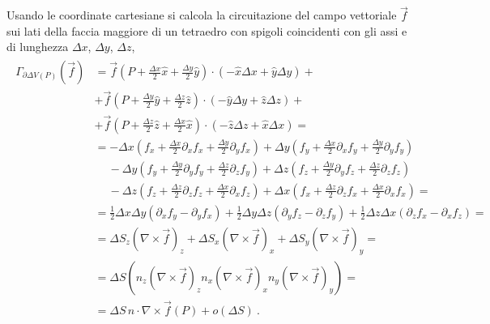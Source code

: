 \documentclass[letterpaper,10pt,english]{jupyterBook}
\begin{document}
\sphinxAtStartPar
Usando le coordinate cartesiane si calcola la circuitazione del campo vettoriale \(\vec{f}\) sui lati della faccia maggiore di un tetraedro con spigoli coincidenti con gli assi e di lunghezza \(\Delta x\), \(\Delta y\), \(\Delta z\),
\begin{equation*}
\begin{split}\begin{aligned}
  \Gamma_{\partial \Delta V(P)}\left(\vec{f}\right) 
  & = \vec{f}\left( P + \frac{\Delta x}{2} \hat{x} + \frac{\Delta y}{2} \hat{y} \right) \cdot \left( - \hat{x} \Delta x + \hat{y} \Delta y \right) + \\
  & + \vec{f}\left( P + \frac{\Delta y}{2} \hat{y} + \frac{\Delta z}{2} \hat{z} \right) \cdot \left( - \hat{y} \Delta y + \hat{z} \Delta z \right) + \\
  & + \vec{f}\left( P + \frac{\Delta z}{2} \hat{z} + \frac{\Delta x}{2} \hat{x} \right) \cdot \left( - \hat{z} \Delta z + \hat{x} \Delta x \right) = \\
  & =       - \Delta x \left( f_x + \frac{\Delta x}{2} \partial_x f_x + \frac{\Delta y}{2} \partial_y f_x \right)
            + \Delta y \left( f_y + \frac{\Delta x}{2} \partial_x f_y + \frac{\Delta y}{2} \partial_y f_y \right) \\
  & \ \quad - \Delta y \left( f_y + \frac{\Delta y}{2} \partial_y f_y + \frac{\Delta z}{2} \partial_z f_y \right)
            + \Delta z \left( f_z + \frac{\Delta y}{2} \partial_y f_z + \frac{\Delta z}{2} \partial_z f_z \right) \\
  & \ \quad - \Delta z \left( f_z + \frac{\Delta z}{2} \partial_z f_z + \frac{\Delta x}{2} \partial_x f_z \right)
            + \Delta x \left( f_x + \frac{\Delta z}{2} \partial_z f_x + \frac{\Delta x}{2} \partial_x f_x \right) = \\
  & = \frac{1}{2} \Delta x \Delta y \left( \partial_x f_y - \partial_y f_x \right)
    + \frac{1}{2} \Delta y \Delta z \left( \partial_y f_z - \partial_z f_y \right)
    + \frac{1}{2} \Delta z \Delta x \left( \partial_z f_x - \partial_x f_z \right) = \\
  & = \Delta S_z \left( \nabla \times \vec{f} \right)_z
    + \Delta S_x \left( \nabla \times \vec{f} \right)_x
    + \Delta S_y \left( \nabla \times \vec{f} \right)_y = \\
  & = \Delta S \left(
             n_z \left( \nabla \times \vec{f} \right)_z
             n_x \left( \nabla \times \vec{f} \right)_x
             n_y \left( \nabla \times \vec{f} \right)_y 
  \right) = \\
  & = \Delta S \, \hat{n} \cdot \nabla \times \vec{f}(P) + o(\Delta S) \ .
\end{aligned}\end{split}
\end{equation*}
\sphinxstepscope
\end{document}
